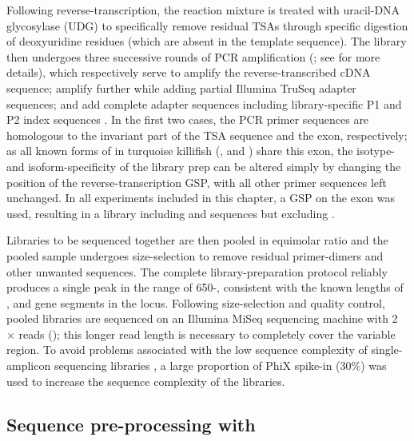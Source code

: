 Following reverse-transcription, the reaction mixture is treated with uracil-DNA glycosylase (UDG) to specifically remove residual TSAs through specific digestion of deoxyuridine residues (which are absent in the template sequence). The library then undergoes three successive rounds of PCR amplification (; see for more details), which respectively serve to amplify the reverse-transcribed cDNA sequence; amplify further while adding partial Illumina TruSeq adapter sequences; and add complete adapter sequences including library-specific P1 and P2 index sequences \parencite{vollmers2013consensus}. In the first two cases, the PCR primer sequences are homologous to the invariant part of the TSA sequence and the  exon, respectively; as all known forms of \igh{} in turquoise killifish (,  and ) share this exon, the isotype- and isoform-specificity of the library prep can be altered simply by changing the position of the reverse-transcription GSP, with all other primer sequences left unchanged. In all experiments included in this chapter, a GSP on the  exon was used, resulting in a library including  and  sequences but excluding .

Libraries to be sequenced together are then pooled in equimolar ratio and the pooled sample undergoes size-selection to remove residual primer-dimers and other unwanted sequences. The complete library-preparation protocol reliably produces a single peak in the range of 650-, consistent with the known lengths of \vh, \dh and \jh gene segments in the \Nfu locus. Following size-selection and quality control, pooled libraries are sequenced on an Illumina MiSeq sequencing machine with 2 ×  reads (); this longer read length is necessary to completely cover the variable region. To avoid problems associated with the low sequence complexity of single-amplicon sequencing libraries \parencite{illumina2017diversity}, a large proportion of PhiX spike-in (30\%) was used to increase the sequence complexity of the libraries.

\subsection{Sequence pre-processing with }
\label{sec:igseq_protocol_preprocess}

